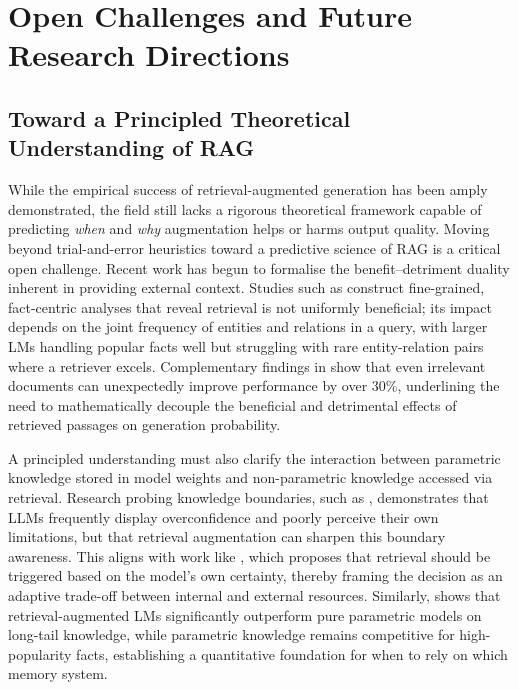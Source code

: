 \documentclass[11pt,a4paper]{article}
\begin{document}
\section{Open Challenges and Future Research Directions}



\subsection{Toward a Principled Theoretical Understanding of RAG}


While the empirical success of retrieval-augmented generation has been amply demonstrated, the field still lacks a rigorous theoretical framework capable of predicting \emph{when} and \emph{why} augmentation helps or harms output quality. Moving beyond trial-and-error heuristics toward a predictive science of RAG is a critical open challenge. Recent work has begun to formalise the benefit--detriment duality inherent in providing external context. Studies such as \cite{arxiv:2402.13492v3} construct fine-grained, fact-centric analyses that reveal retrieval is not uniformly beneficial; its impact depends on the joint frequency of entities and relations in a query, with larger LMs handling popular facts well but struggling with rare entity-relation pairs where a retriever excels. Complementary findings in \cite{arxiv:2401.14887v3} show that even irrelevant documents can unexpectedly improve performance by over 30\%, underlining the need to mathematically decouple the beneficial and detrimental effects of retrieved passages on generation probability.

A principled understanding must also clarify the interaction between parametric knowledge stored in model weights and non-parametric knowledge accessed via retrieval. Research probing knowledge boundaries, such as \cite{arxiv:2307.11019v2}, demonstrates that LLMs frequently display overconfidence and poorly perceive their own limitations, but that retrieval augmentation can sharpen this boundary awareness. This aligns with work like \cite{arxiv:2402.11457v1}, which proposes that retrieval should be triggered based on the model's own certainty, thereby framing the decision as an adaptive trade-off between internal and external resources. Similarly, \cite{arxiv:2212.10511v4} shows that retrieval-augmented LMs significantly outperform pure parametric models on long-tail knowledge, while parametric knowledge remains competitive for high-popularity facts, establishing a quantitative foundation for when to rely on which memory system.
\end{document}
